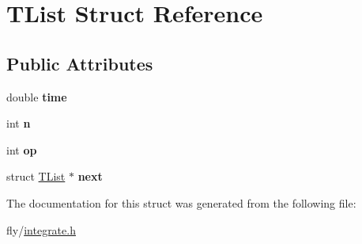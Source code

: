 \hypertarget{structTList}{
\section{TList Struct Reference}
\label{structTList}
}
\subsection*{Public Attributes}
\begin{DoxyCompactItemize}
\item 
\hypertarget{structTList_a12ba5963a9b03aac1f827eaacb55ed65}{
double {\bfseries time}}
\label{structTList_a12ba5963a9b03aac1f827eaacb55ed65}

\item 
\hypertarget{structTList_a61de390b0eeff109feae1234983e33c2}{
int {\bfseries n}}
\label{structTList_a61de390b0eeff109feae1234983e33c2}

\item 
\hypertarget{structTList_a66b0f73bfb1cc7c12d6b79ad7b5df652}{
int {\bfseries op}}
\label{structTList_a66b0f73bfb1cc7c12d6b79ad7b5df652}

\item 
\hypertarget{structTList_adc10fbeb27d10edb94adb17b8a008eed}{
struct \hyperlink{structTList}{TList} $\ast$ {\bfseries next}}
\label{structTList_adc10fbeb27d10edb94adb17b8a008eed}

\end{DoxyCompactItemize}


The documentation for this struct was generated from the following file:\begin{DoxyCompactItemize}
\item 
fly/\hyperlink{integrate_8h}{integrate.h}\end{DoxyCompactItemize}
